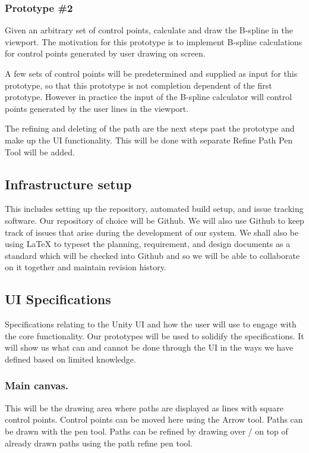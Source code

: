 \documentclass[12pt]{article}
\begin{document}
\subsubsection{Prototype \#2} 
\label{sec:ptype2}
Given an arbitrary set of control points, calculate and draw the B-spline in the viewport. The motivation for this prototype is to implement B-spline calculations for control points generated by user drawing on screen.

A few sets of control points will be predetermined and supplied as input for this prototype, so that this prototype is not completion dependent of the first prototype. However in practice the input of the B-spline calculator will control points generated by the user lines in the viewport.

The refining and deleting of the path are the next steps past the prototype and make up the UI functionality. This will be done with separate Refine Path Pen Tool will be added.

\subsection{Infrastructure setup}
This includes setting up the repository, automated build setup, and issue tracking software. Our repository of choice will be Github. We will also use Github to keep track of issues that arise during the development of our system. We shall also be using LaTeX to typeset the planning, requirement, and design documents as a standard which will be checked into Github and so we will be able to collaborate on it together and maintain revision history.

\subsection{UI Specifications}
Specifications relating to the Unity UI and how the user will use to engage with the core functionality. Our prototypes will be used to solidify the specifications. It will show us what can and cannot be done through the UI in the ways we have defined based on limited knowledge.

\subsubsection{Main canvas.} This will be the drawing area where paths are displayed as lines with square control points. Control points can be moved here using the Arrow tool. Paths can be drawn with the pen tool. Paths can be refined by drawing over / on top of already drawn paths using the path refine pen tool.
\end{document}
